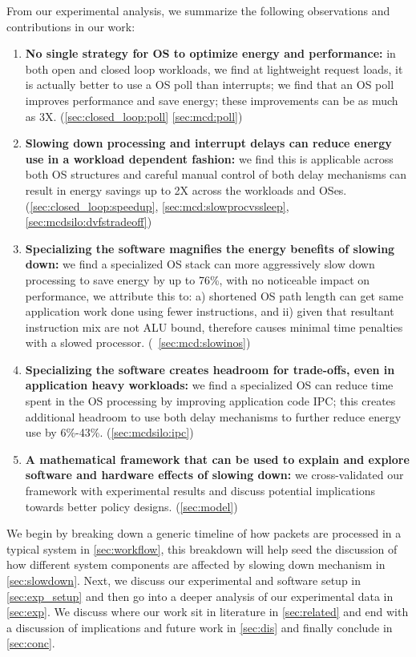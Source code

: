 From our experimental analysis, we summarize the following observations and contributions in our work:
\begin{enumerate}
    \item \textbf{No single strategy for OS to optimize energy and performance:} in both open and closed loop workloads, we find at lightweight request loads, it is actually better to use a OS poll than interrupts; we find that an OS poll improves performance and save energy; these improvements can be as much as 3X. (\cref{sec:closed_loop:poll} \cref{sec:mcd:poll}) 
    \item \textbf{Slowing down processing and interrupt delays can reduce energy use in a workload dependent fashion:} we find this is applicable across both OS structures and careful manual control of both delay mechanisms can result in energy savings up to 2X across the workloads and OSes. (\cref{sec:closed_loop:speedup}, \cref{sec:mcd:slowprocvssleep}, \cref{sec:mcdsilo:dvfstradeoff})
    \item \textbf{Specializing the software magnifies the energy benefits of slowing down:} we find a specialized OS stack can more aggressively slow down processing to save energy by up to 76\%, with no noticeable impact on performance, we attribute this to: a) shortened OS path length can get same application work done using fewer instructions, and ii) given that resultant instruction mix are not ALU bound, therefore causes minimal time penalties with a slowed processor. (~\cref{sec:mcd:slowinos})
    \item \textbf{Specializing the software creates headroom for trade-offs, even in application heavy workloads:} we find a specialized OS can reduce time spent in the OS processing by improving application code IPC; this creates additional headroom to use both delay mechanisms to further reduce energy use by 6\%-43\%. (\cref{sec:mcdsilo:ipc}) 
    \item \textbf{A mathematical framework that can be used to explain and explore software and hardware effects of slowing down:} we cross-validated our framework with experimental results and discuss potential implications towards better policy designs. (\cref{sec:model})
\end{enumerate}

We begin by breaking down a generic timeline of how packets are processed in a typical system in \cref{sec:workflow}, this breakdown will help seed the discussion of how different system components are affected by slowing down mechanism in \cref{sec:slowdown}. Next, we discuss our experimental and software setup in \cref{sec:exp_setup} and then go into a deeper analysis of our experimental data in \cref{sec:exp}. We discuss where our work sit in literature in \cref{sec:related} and end with a discussion of implications and future work in \cref{sec:dis} and finally conclude in \cref{sec:conc}. 

